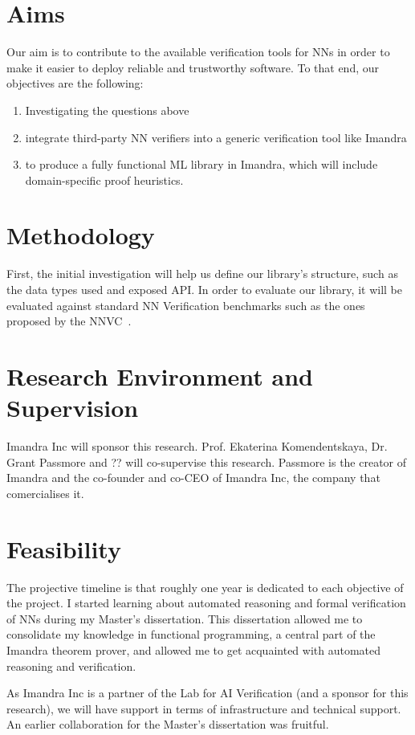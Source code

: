 \documentclass[]{article}
\begin{document}
\section{Aims}
Our aim is to contribute to the available verification tools for NNs in order to make it easier to deploy reliable and trustworthy software. To that end, our objectives are the following:
\begin{enumerate}
\item Investigating the questions above
\item integrate third-party NN verifiers into a generic verification tool like Imandra
\item to produce a fully functional ML library in Imandra, which will include domain-specific proof heuristics.
\end{enumerate}

\section{Methodology}
First, the initial investigation will help us define our library's structure, such as the data types used and exposed API. 
In order to evaluate our library, it will be evaluated against standard NN Verification benchmarks such as the ones proposed by the NNVC~\cite{}.

\section{Research Environment and Supervision}
Imandra Inc will sponsor this research. 
Prof. Ekaterina Komendentskaya, Dr. Grant Passmore and ?? will co-supervise this research.
Passmore is the creator of Imandra and the co-founder and co-CEO of Imandra Inc, the company that comercialises it.

\section{Feasibility}
The projective timeline is that roughly one year is dedicated to each objective of the project.
I started learning about automated reasoning and formal verification of NNs during my Master's dissertation. This dissertation allowed me to consolidate my knowledge in functional programming, a central part of the Imandra theorem prover, and allowed me to get acquainted with automated reasoning and verification.

As Imandra Inc is a partner of the Lab for AI Verification (and a sponsor for this research), we will have support in terms of infrastructure and technical support. An earlier collaboration for the Master's dissertation was fruitful.
\end{document}
